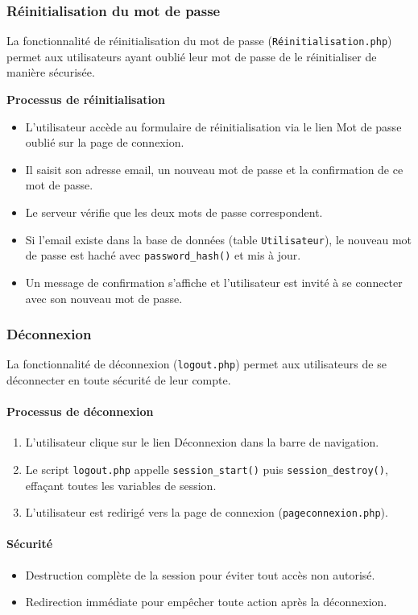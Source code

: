 \documentclass[a4paper,12pt]{article}
\begin{document}
\subsubsection{Réinitialisation du mot de passe}
La fonctionnalité de réinitialisation du mot de passe (\texttt{Réinitialisation.php}) permet aux utilisateurs ayant oublié leur mot de passe de le réinitialiser de manière sécurisée.

\textbf{Processus de réinitialisation}
\begin{itemize}
  \item L'utilisateur accède au formulaire de réinitialisation via le lien \og Mot de passe oublié \fg{} sur la page de connexion.
  \item Il saisit son adresse email, un nouveau mot de passe et la confirmation de ce mot de passe.
  \item Le serveur vérifie que les deux mots de passe correspondent.
  \item Si l'email existe dans la base de données (table \texttt{Utilisateur}), le nouveau mot de passe est haché avec \texttt{password\_hash()} et mis à jour.
  \item Un message de confirmation s'affiche et l'utilisateur est invité à se connecter avec son nouveau mot de passe.
\end{itemize}

\subsubsection{Déconnexion}
La fonctionnalité de déconnexion (\texttt{logout.php}) permet aux utilisateurs de se déconnecter en toute sécurité de leur compte.
\paragraph{Processus de déconnexion}
\begin{enumerate}
  \item L'utilisateur clique sur le lien \og Déconnexion \fg{} dans la barre de navigation.
  \item Le script \texttt{logout.php} appelle \texttt{session\_start()} puis \texttt{session\_destroy()}, effaçant toutes les variables de session.
  \item L'utilisateur est redirigé vers la page de connexion (\texttt{pageconnexion.php}).
\end{enumerate}

\paragraph{Sécurité}
\begin{itemize}
  \item Destruction complète de la session pour éviter tout accès non autorisé.
  \item Redirection immédiate pour empêcher toute action après la déconnexion.
\end{itemize}
\end{document}

